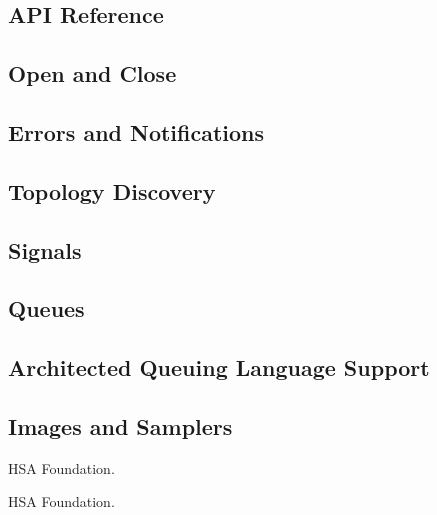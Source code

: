 \documentclass[draft]{book}
\begin{document}
\begin{appendices}
\chapter{API Reference}

\section{Open and Close}

\section{Errors and Notifications}


\section{Topology Discovery}


\section{Signals}


\section{Queues}


\section{Architected Queuing Language Support}


\section{Images and Samplers}


\end{appendices}


\begin{thebibliography}{30}

HSA Foundation.

HSA Foundation.

\end{thebibliography}
\end{document}
